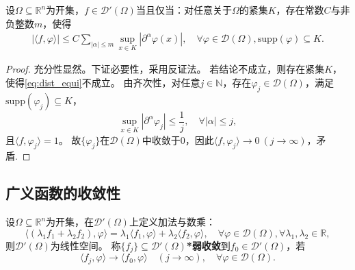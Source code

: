 \documentclass[../../main.tex]{subfiles}%
\begin{document}
\begin{theorem}
设$\Omega\subseteq\mathbb{R}^n$为开集，$f\in\mathscr{D}'(\Omega)$当且仅当：对任意关于$\Omega$的紧集$K$，存在常数$C$与非负整数$m$，使得
\begin{align}
|\langle f,\varphi\rangle|\leqslant C\sum\limits_{|\alpha|\leqslant m}\sup\limits_{x\in K}|\partial^\alpha\varphi(x)|,\quad\forall\varphi\in\mathscr{D}(\Omega),\mathrm{supp}(\varphi)\subseteq K.\label{eq:dist_equi}
\end{align}
\end{theorem}
\begin{proof}

充分性显然。下证必要性，采用反证法。
若结论不成立，则存在紧集$K$，使得\eqref{eq:dist_equi}不成立。
由齐次性，对任意$j\in\mathbb{N}$，存在$\varphi_j\in\mathscr{D}(\Omega)$，满足$\mathrm{supp}(\varphi_j)\subseteq K$，
$$\sup\limits_{x\in K}|\partial^\alpha\varphi_j|\leqslant\frac{1}{j},\quad\forall|\alpha|\leqslant j,$$
且$\langle f,\varphi_j\rangle=1$。
故$\{\varphi_j\}$在$\mathscr{D}(\Omega)$中收敛于0，因此$\langle f,\varphi_j\rangle\to0\ (j\to\infty)$，矛盾.

\end{proof}

\subsection{广义函数的收敛性}

\begin{definition}
设$\Omega\subseteq\mathbb{R}^n$为开集，在$\mathscr{D}'(\Omega)$上定义加法与数乘：
$$\langle(\lambda_1f_1+\lambda_2f_2),\varphi\rangle=\lambda_1\langle f_1,\varphi\rangle+\lambda_2\langle f_2,\varphi\rangle,\quad\forall\varphi\in\mathscr{D}(\Omega),\forall\lambda_1,\lambda_2\in\mathbb{R},$$
则$\mathscr{D}'(\Omega)$为线性空间。
称$\{f_j\}\subseteq\mathscr{D}'(\Omega)$\textbf{*弱收敛}到$f_0\in\mathscr{D}'(\Omega)$，若
$$\langle f_j,\varphi\rangle\to\langle f_0,\varphi\rangle\quad(j\to\infty),\quad\forall\varphi\in\mathscr{D}(\Omega).$$
\end{definition}
\end{document}

